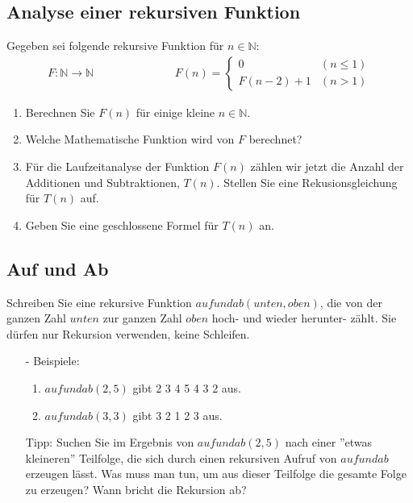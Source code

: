 \documentclass{article}
\begin{document}
\subsection{Analyse einer rekursiven Funktion}
Gegeben sei folgende rekursive Funktion für $n \in \mathbb{N}$:
\[
\begin{aligned}
    F: \mathbb{N} \rightarrow \mathbb{N} 
    & & & & & & & & &
    F(n) = \begin{cases}
            0 & (n \leq 1) \\
            F(n-2)+1 & (n > 1)
    \end{cases}
\end{aligned}
\]
\begin{enumerate}[label=$\alph*)$]
    \item Berechnen Sie $F(n)$ für einige kleine $n \in \mathbb{N}$.
    \item Welche Mathematische Funktion wird von $F$ berechnet?
    \item Für die Laufzeitanalyse der Funktion $F(n)$ zählen wir jetzt die Anzahl der Additionen und Subtraktionen, $T(n)$. Stellen Sie eine Rekusionsgleichung für $T(n)$ auf.
    \item Geben Sie eine geschlossene Formel für $T(n)$ an.
\end{enumerate}
\subsection{Auf und Ab}
Schreiben Sie eine rekursive Funktion $aufundab(unten, oben)$, die von der ganzen Zahl $unten$ zur ganzen Zahl $oben$ hoch- und wieder herunter- zählt. Sie dürfen nur Rekursion verwenden, keine Schleifen.
\begin{itemize}
    \item[-] Beispiele:
    \begin{enumerate}[label=$\alph*)$]
        \item $aufundab(2,5)$ gibt 2 3 4 5 4 3 2 aus.
        \item $aufundab(3,3)$ gibt 3 2 1 2 3 aus.
    \end{enumerate}
    \item[] Tipp: Suchen Sie im Ergebnis von $aufundab(2,5)$ nach einer ''etwas kleineren'' Teilfolge, die sich durch einen rekursiven Aufruf von $aufundab$ erzeugen lässt. Was muss man tun, um aus dieser Teilfolge die gesamte Folge zu erzeugen? Wann bricht die Rekursion ab?
\end{itemize}
\end{document}
